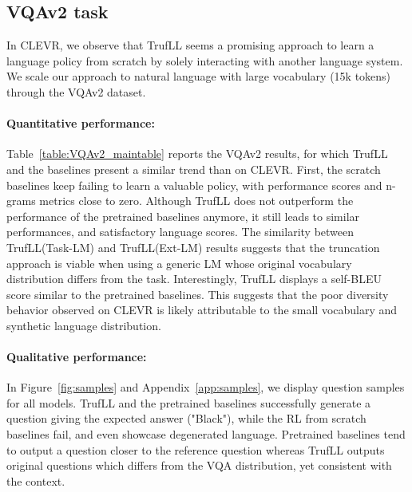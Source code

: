 \documentclass{article}
\newcommand{\algo}{TrufLL\xspace}
\begin{document}
\subsection{VQAv2 task}
\label{subsec:exp:VQAv2}

In CLEVR, we observe that \algo seems a promising approach to learn a language policy from scratch by solely interacting with another language system. 
We scale our approach to natural language with large vocabulary (15k tokens) through the VQAv2 dataset.

\paragraph{Quantitative performance:} 
Table~\ref{table:VQAv2_maintable} reports the VQAv2 results, for which \algo and the baselines present a similar trend than on CLEVR. 
First, the scratch baselines keep failing to learn a valuable policy, with performance scores and n-grams metrics close to zero. Although \algo does not outperform the performance of the pretrained baselines anymore, it still leads to similar performances, and satisfactory language scores. The similarity between \algo(Task-LM) and \algo(Ext-LM) results suggests that the truncation approach is viable when using a generic LM whose original vocabulary distribution differs from the task. Interestingly, \algo displays a self-BLEU score similar to the pretrained baselines. This suggests that the poor diversity behavior observed on CLEVR is likely attributable to the small vocabulary and synthetic language distribution. 

\paragraph{Qualitative performance:} 
In Figure~\ref{fig:samples} and Appendix~\ref{app:samples}, we display question samples for all models. \algo and the pretrained baselines successfully generate a question giving the expected answer ("Black"), while the RL from scratch baselines fail, and even showcase degenerated language. 
Pretrained baselines tend to output a question closer to the reference question whereas \algo outputs original questions which differs from the VQA distribution, yet consistent with the context. 
\end{document}
